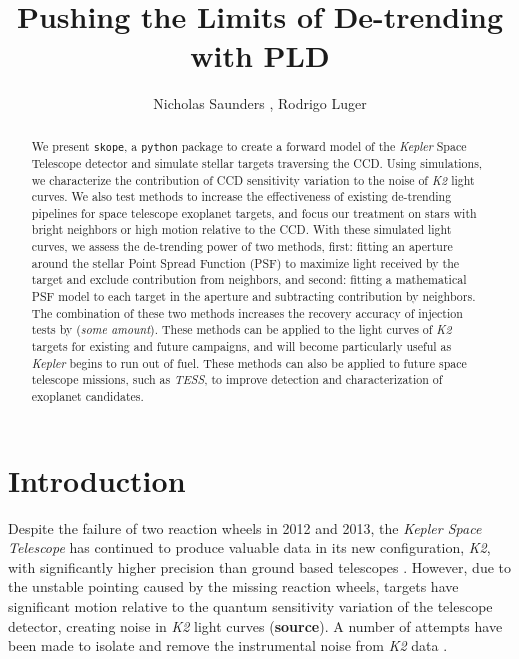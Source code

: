 \documentclass[12pt,preprint]{emulateapj}
\begin{document}
\title{Pushing the Limits of De-trending with PLD}

\author{Nicholas Saunders , Rodrigo Luger }


\begin{abstract}

	We present \texttt{skope}, a \texttt{python} package to create a forward model of the \textit{Kepler} Space Telescope detector and simulate stellar targets traversing the CCD. Using simulations, we characterize the contribution of CCD sensitivity variation to the noise of \textit{K2} light curves. We also test methods to increase the effectiveness of existing de-trending pipelines for space telescope exoplanet targets, and focus our treatment on stars with bright neighbors or high motion relative to the CCD. With these simulated light curves, we assess the de-trending power of two methods, first: fitting an aperture around the stellar Point Spread Function (PSF) to maximize light received by the target and exclude contribution from neighbors, and second: fitting a mathematical PSF model to each target in the aperture and subtracting contribution by neighbors. The combination of these two methods increases the recovery accuracy of injection tests by (\textit{some amount}). These methods can be applied to the light curves of \textit{K2} targets for existing and future campaigns, and will become particularly useful as \textit{Kepler} begins to run out of fuel. These methods can also be applied to future space telescope missions, such as \textit{TESS}, to improve detection and characterization of exoplanet candidates.

\end{abstract}

\section{Introduction}

Despite the failure of two reaction wheels in 2012 and 2013, the \textit{Kepler Space Telescope} has continued to produce valuable data in its new configuration, \textit{K2}, with significantly higher precision than ground based telescopes \citep{2014PASP..126..398H}. However, due to the unstable pointing caused by the missing reaction wheels, targets have significant motion relative to the quantum sensitivity variation of the telescope detector, creating noise in \textit{K2} light curves (\textbf{source}). A number of attempts have been made to isolate and remove the instrumental noise from \textit{K2} data \citep{2015A&A...579A..19A, 0004-637X-806-1-30, 2015MNRAS.454.4159H, 2015MNRAS.447.2880A, 2016MNRAS.459.2408A}.
\end{document}
